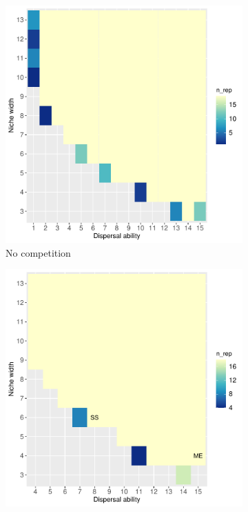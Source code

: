 %
\begin{figure}
	\centering
	\begin{subfigure}[b]{0.45\linewidth}
		\includegraphics[width=\linewidth]{./figures/Parameter_space_overlook_no_competition.pdf}
		\caption{No competition}
		\label{fig:para-no}
	\end{subfigure}
	\begin{subfigure}[b]{0.45\linewidth}
		\includegraphics[width=\linewidth]{./figures/Parameter_space_overlook_stable_competition.pdf}

\end{subfigure}
\end{figure}
